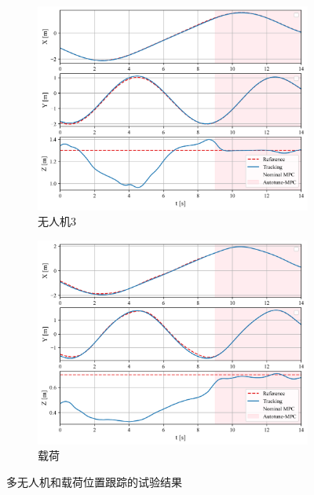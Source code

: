 \documentclass[lang=chs, degree=master, blindreview=false, winfonts=true]{yanputhesis}
\begin{document}
\begin{figure}[H]
	\vspace{0.5cm} %
	
	\begin{subfigure}[b]{0.48\textwidth}
		\centering
		\includegraphics[width=\textwidth]{picture/kk/6.png}
		\caption{无人机3}
		\label{quadrotor02}
	\end{subfigure}
	\hfill
	\begin{subfigure}[b]{0.48\textwidth}
		\centering
		\includegraphics[width=\textwidth]{picture/kk/8.png}
		\caption{载荷}
		\label{load0}
	\end{subfigure}
	
	\caption{多无人机和载荷位置跟踪的试验结果}
	\label{t}
\end{figure}
\end{document}
